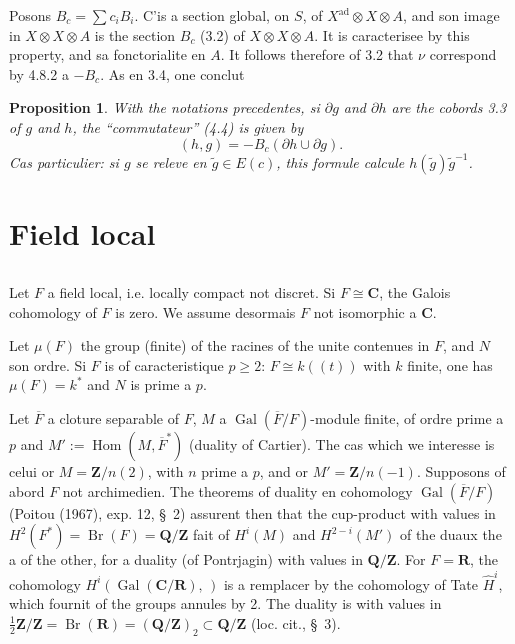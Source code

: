 \documentclass[11pt,a4paper]{article}
\theoremstyle{plain}
\newtheorem{proposition}[theorem]{Proposition}
\theoremstyle{definition}
\DeclareMathOperator{\Gal}{Gal}
\DeclareMathOperator{\Hom}{Hom}
\DeclareMathOperator{\ad}{ad}
\DeclareMathOperator{\Br}{Br}
\begin{document}
Posons $B_c = \sum c_i B_i$. C'is a section global, on $S$, of $X^{\ad} \otimes X \otimes A$, and son image in $X \otimes X \otimes A$ is the section $B_c$ (3.2) of $X \otimes X \otimes A$. It is caracterisee by this property, and sa fonctorialite en $A$. It follows therefore of 3.2 that $\nu$ correspond by 4.8.2 a $-B_c$. As en 3.4, one conclut

\begin{proposition}\label{4.9}
With the notations precedentes, si $\partial g$ and $\partial h$ are the cobords 3.3 of $g$ and $h$, the ``commutateur'' (4.4) is given by
\[
(h, g) = -B_c(\partial h \cup \partial g).
\]
Cas particulier: si $g$ se releve en $\tilde{g} \in E(c)$, this formule calcule $h(\tilde{g}) \tilde{g}^{-1}$.
\end{proposition}

\section{Field local}

\subsection{}\label{5.1}

Let $F$ a field local, i.e. locally compact not discret. Si $F \cong \mathbf{C}$, the Galois cohomology of $F$ is zero. We assume desormais $F$ not isomorphic a $\mathbf{C}$.

Let $\mu(F)$ the group (finite) of the racines of the unite contenues in $F$, and $N$ son ordre. Si $F$ is of caracteristique $p \geq 2$: $F \cong k((t))$ with $k$ finite, one has $\mu(F) = k^*$ and $N$ is prime a $p$.

Let $\overline{F}$ a cloture separable of $F$, $M$ a $\Gal(\overline{F}/F)$-module finite, of ordre prime a $p$ and $M' := \Hom(M, \overline{F}^*)$ (duality of Cartier). The cas which we interesse is celui or $M = \mathbf{Z}/n(2)$, with $n$ prime a $p$, and or $M' = \mathbf{Z}/n(-1)$. Supposons of abord $F$ not archimedien. The theorems of duality en cohomology $\Gal(\overline{F}/F)$ (Poitou (1967), exp. 12, \S~2) assurent then that the cup-product with values in $H^2(F^*) = \Br(F) = \mathbf{Q}/\mathbf{Z}$ fait of $H^i(M)$ and $H^{2-i}(M')$ of the duaux the a of the other, for a duality (of Pontrjagin) with values in $\mathbf{Q}/\mathbf{Z}$. For $F = \mathbf{R}$, the cohomology $H^i(\Gal(\mathbf{C}/\mathbf{R}), \,)$ is a remplacer by the cohomology of Tate $\widehat{H}^i$, which fournit of the groups annules by 2. The duality is with values in $\frac{1}{2}\mathbf{Z}/\mathbf{Z} = \Br(\mathbf{R}) = (\mathbf{Q}/\mathbf{Z})_2 \subset \mathbf{Q}/\mathbf{Z}$ (loc. cit., \S~3).
\end{document}

